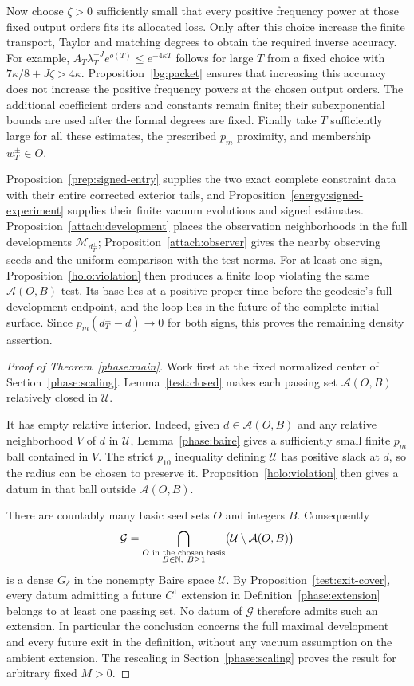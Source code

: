 Now choose $\zeta>0$ sufficiently small that every positive frequency
power at those fixed output orders fits its allocated loss. Only after
this choice increase the finite transport, Taylor and matching degrees
to obtain the required inverse accuracy. For example,
$A_T\lambda_T^{-J}e^{o(T)}\le e^{-4\kappa T}$ follows for large $T$
from a fixed choice with $7\kappa/8+J\zeta>4\kappa$.
Proposition~\ref{bg:packet} ensures that increasing this accuracy does
not increase the positive frequency powers at the chosen output
orders. The additional coefficient orders and constants remain finite;
their subexponential bounds are used after the formal degrees are fixed.
Finally take $T$ sufficiently large for all these estimates, the
prescribed $p_m$ proximity, and membership $w_T^\pm\in O$.

Proposition~\ref{prep:signed-entry} supplies the two exact complete
constraint data with their entire corrected exterior tails, and
Proposition~\ref{energy:signed-experiment} supplies their finite vacuum
evolutions and signed estimates. Proposition~\ref{attach:development}
places the observation neighborhoods in the full developments
$\mathcal M_{d_T^\pm}$; Proposition~\ref{attach:observer} gives the
nearby observing seeds and the uniform comparison with the test norms.
For at least one sign, Proposition~\ref{holo:violation} then produces
a finite loop violating the same $\mathcal A(O,B)$ test. Its base lies
at a positive proper time before the geodesic's full-development
endpoint, and the loop lies in the future of the complete initial
surface. Since $p_m(d_T^\pm-d)\to0$ for both signs, this proves the
remaining density assertion.

\begin{proof}[Proof of Theorem~\ref{phase:main}]
Work first at the fixed normalized center of
Section~\ref{phase:scaling}.
Lemma~\ref{test:closed} makes each passing set
\(\mathcal A(O,B)\) relatively closed in \(\mathcal U\).

It has empty relative interior. Indeed, given
\(d\in\mathcal A(O,B)\) and any relative neighborhood \(V\) of \(d\)
in \(\mathcal U\), Lemma~\ref{phase:baire} gives a sufficiently
small finite \(p_m\) ball contained in \(V\).
The strict \(p_{10}\) inequality defining \(\mathcal U\) has positive
slack at \(d\), so the radius can be chosen to preserve it.
Proposition~\ref{holo:violation} then gives a datum in
that ball outside \(\mathcal A(O,B)\).

There are countably many basic seed sets \(O\) and integers \(B\).
Consequently
\[
 \mathcal G=
 \bigcap_{\substack{O\text{ in the chosen basis}\\ B\in\mathbb N,\ B\ge1}}
       \bigl(\mathcal U\setminus\mathcal A(O,B)\bigr)
\]
is a dense \(G_\delta\) in the nonempty Baire space \(\mathcal U\).
By Proposition~\ref{test:exit-cover}, every datum admitting a
future \(C^1\) extension in Definition~\ref{phase:extension}
belongs to at least one passing set. No datum of \(\mathcal G\)
therefore admits such an extension. In particular the conclusion
concerns the full maximal development and every future exit in
the definition, without any vacuum assumption on the ambient
extension. The rescaling in Section~\ref{phase:scaling} proves
the result for arbitrary fixed \(M>0\).
\end{proof}
